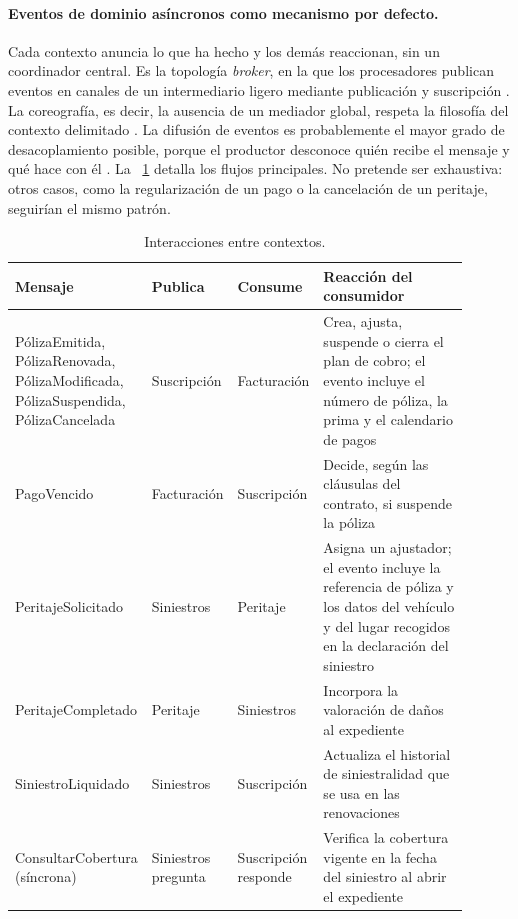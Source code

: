 \paragraph{Eventos de dominio asíncronos como mecanismo por defecto.}
Cada contexto anuncia lo que ha hecho y los demás reaccionan, sin un coordinador central.
Es la topología \textit{broker}, en la que los procesadores publican eventos en canales
de un intermediario ligero mediante publicación y suscripción
\parencite[cap.~14]{richardsford2020}. La coreografía, es decir, la ausencia de un
mediador global, respeta la filosofía del contexto delimitado
\parencite[cap.~17]{richardsford2020}. La difusión de eventos es probablemente el mayor
grado de desacoplamiento posible, porque el productor desconoce quién recibe el mensaje y
qué hace con él \parencite[cap.~14]{richardsford2020}. La \tablename~\ref{tab:p3-eventos}
detalla los flujos principales. No pretende ser exhaustiva: otros casos, como la
regularización de un pago o la cancelación de un peritaje, seguirían el mismo patrón.

\begin{table}[htbp]
  \centering
  \caption{Interacciones entre contextos.}
  \label{tab:p3-eventos}
  \small
  \renewcommand{\arraystretch}{1.2}
  \setlength{\tabcolsep}{4pt}
  \begin{tabular}{@{}p{0.25\linewidth}p{0.15\linewidth}p{0.15\linewidth}p{0.35\linewidth}@{}}
    \toprule
    \textbf{Mensaje} & \textbf{Publica} & \textbf{Consume} & \textbf{Reacción del consumidor} \\
    \midrule
    \raggedright PólizaEmitida, PólizaRenovada, PólizaModificada, PólizaSuspendida,
      PólizaCancelada
      & \raggedright Suscripción & \raggedright Facturación
      & \raggedright Crea, ajusta, suspende o cierra el plan de cobro; el evento incluye el
        número de póliza, la prima y el calendario de pagos \tabularnewline
    \raggedright PagoVencido & \raggedright Facturación & \raggedright Suscripción
      & \raggedright Decide, según las cláusulas del contrato, si suspende la póliza
      \tabularnewline
    \raggedright PeritajeSolicitado & \raggedright Siniestros & \raggedright Peritaje
      & \raggedright Asigna un ajustador; el evento incluye la referencia de póliza y los
        datos del vehículo y del lugar recogidos en la declaración del siniestro
      \tabularnewline
    \raggedright PeritajeCompletado & \raggedright Peritaje & \raggedright Siniestros
      & \raggedright Incorpora la valoración de daños al expediente \tabularnewline
    \raggedright SiniestroLiquidado & \raggedright Siniestros & \raggedright Suscripción
      & \raggedright Actualiza el historial de siniestralidad que se usa en las renovaciones
      \tabularnewline
    \addlinespace
    \raggedright ConsultarCobertura (síncrona) & \raggedright Siniestros pregunta
      & \raggedright Suscripción responde
      & \raggedright Verifica la cobertura vigente en la fecha del siniestro al abrir el
        expediente \tabularnewline
    \bottomrule
  \end{tabular}
\end{table}

